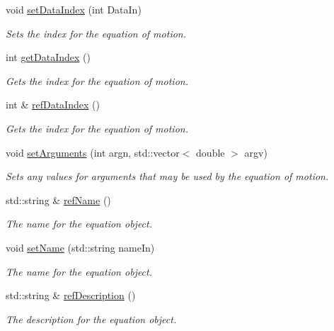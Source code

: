 \begin{DoxyCompactItemize}
void \hyperlink{classosea_1_1ofreq_1_1_equationof_motion_a5a8674f3d8715973fa0affc162ae677c}{set\-Data\-Index} (int Data\-In)
\begin{DoxyCompactList}\small\item\em Sets the index for the equation of motion. \end{DoxyCompactList}\item 
int \hyperlink{classosea_1_1ofreq_1_1_equationof_motion_a45052d6a9814ffa899d1824f5d8e8cee}{get\-Data\-Index} ()
\begin{DoxyCompactList}\small\item\em Gets the index for the equation of motion. \end{DoxyCompactList}\item 
int \& \hyperlink{classosea_1_1ofreq_1_1_equationof_motion_ae16051cbf725210aa44941d41d8800e2}{ref\-Data\-Index} ()
\begin{DoxyCompactList}\small\item\em Gets the index for the equation of motion. \end{DoxyCompactList}\item 
void \hyperlink{classosea_1_1ofreq_1_1_equationof_motion_a154640d80a23348fa9183b6c4ebe3f37}{set\-Arguments} (int argn, std\-::vector$<$ double $>$ argv)
\begin{DoxyCompactList}\small\item\em Sets any values for arguments that may be used by the equation of motion. \end{DoxyCompactList}\item 
std\-::string \& \hyperlink{classosea_1_1ofreq_1_1_equationof_motion_abb7b1a4295e8406ea4f155b1f03689f6}{ref\-Name} ()
\begin{DoxyCompactList}\small\item\em The name for the equation object. \end{DoxyCompactList}\item 
void \hyperlink{classosea_1_1ofreq_1_1_equationof_motion_a1dba2d5b5a3d8c156c010ccb39c3bbe0}{set\-Name} (std\-::string name\-In)
\begin{DoxyCompactList}\small\item\em The name for the equation object. \end{DoxyCompactList}\item 
std\-::string \& \hyperlink{classosea_1_1ofreq_1_1_equationof_motion_a5be5a333dd1a5a65eaadec4b32c68fb5}{ref\-Description} ()
\begin{DoxyCompactList}\small\item\em The description for the equation object. \end{DoxyCompactList}\item 

\end{DoxyCompactItemize}
